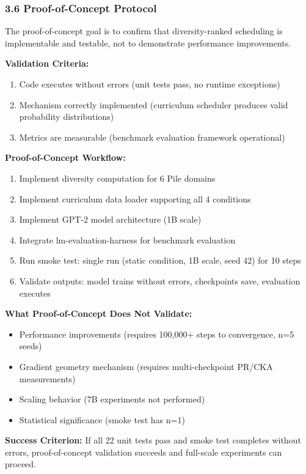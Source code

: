 \subsubsection{3.6 Proof-of-Concept Protocol}

The proof-of-concept goal is to confirm that diversity-ranked scheduling is implementable and testable, not to demonstrate performance improvements.

\textbf{Validation Criteria:}
\begin{enumerate}
\item Code executes without errors (unit tests pass, no runtime exceptions)
\item Mechanism correctly implemented (curriculum scheduler produces valid probability distributions)
\item Metrics are measurable (benchmark evaluation framework operational)
\end{enumerate}

\textbf{Proof-of-Concept Workflow:}
\begin{enumerate}
\item Implement diversity computation for 6 Pile domains
\item Implement curriculum data loader supporting all 4 conditions
\item Implement GPT-2 model architecture (1B scale)
\item Integrate lm-evaluation-harness for benchmark evaluation
\item Run smoke test: single run (static condition, 1B scale, seed 42) for 10 steps
\item Validate outputs: model trains without errors, checkpoints save, evaluation executes
\end{enumerate}

\textbf{What Proof-of-Concept Does Not Validate:}
\begin{itemize}
\item Performance improvements (requires 100,000+ steps to convergence, n=5 seeds)
\item Gradient geometry mechanism (requires multi-checkpoint PR/CKA measurements)
\item Scaling behavior (7B experiments not performed)
\item Statistical significance (smoke test has n=1)
\end{itemize}

\textbf{Success Criterion:} If all 22 unit tests pass and smoke test completes without errors, proof-of-concept validation succeeds and full-scale experiments can proceed.
